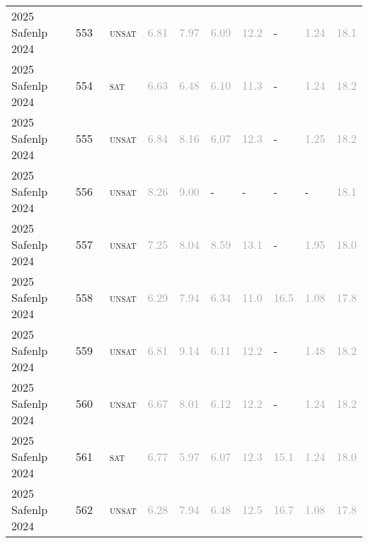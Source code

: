 \begin{center}
{\begin{longtable}{@{}llllllllll@{}}
2025 Safenlp 2024 & 553 & ~\textsc{unsat} & \textcolor{darkgray}{6.81} & \textcolor{darkgray}{7.97} & \textcolor{darkgray}{6.09} & \textcolor{darkgray}{12.2} & - & \textcolor{darkgray}{1.24} & \textcolor{darkgray}{18.1} \\
2025 Safenlp 2024 & 554 & ~\textsc{sat} & \textcolor{darkgray}{6.63} & \textcolor{darkgray}{6.48} & \textcolor{darkgray}{6.10} & \textcolor{darkgray}{11.3} & - & \textcolor{darkgray}{1.24} & \textcolor{darkgray}{18.2} \\
2025 Safenlp 2024 & 555 & ~\textsc{unsat} & \textcolor{darkgray}{6.84} & \textcolor{darkgray}{8.16} & \textcolor{darkgray}{6.07} & \textcolor{darkgray}{12.3} & - & \textcolor{darkgray}{1.25} & \textcolor{darkgray}{18.2} \\
2025 Safenlp 2024 & 556 & ~\textsc{unsat} & \textcolor{darkgray}{8.26} & \textcolor{darkgray}{9.00} & - & - & - & - & \textcolor{darkgray}{18.1} \\
2025 Safenlp 2024 & 557 & ~\textsc{unsat} & \textcolor{darkgray}{7.25} & \textcolor{darkgray}{8.04} & \textcolor{darkgray}{8.59} & \textcolor{darkgray}{13.1} & - & \textcolor{darkgray}{1.95} & \textcolor{darkgray}{18.0} \\
2025 Safenlp 2024 & 558 & ~\textsc{unsat} & \textcolor{darkgray}{6.29} & \textcolor{darkgray}{7.94} & \textcolor{darkgray}{6.34} & \textcolor{darkgray}{11.0} & \textcolor{darkgray}{16.5} & \textcolor{darkgray}{1.08} & \textcolor{darkgray}{17.8} \\
2025 Safenlp 2024 & 559 & ~\textsc{unsat} & \textcolor{darkgray}{6.81} & \textcolor{darkgray}{9.14} & \textcolor{darkgray}{6.11} & \textcolor{darkgray}{12.2} & - & \textcolor{darkgray}{1.48} & \textcolor{darkgray}{18.2} \\
2025 Safenlp 2024 & 560 & ~\textsc{unsat} & \textcolor{darkgray}{6.67} & \textcolor{darkgray}{8.01} & \textcolor{darkgray}{6.12} & \textcolor{darkgray}{12.2} & - & \textcolor{darkgray}{1.24} & \textcolor{darkgray}{18.2} \\
2025 Safenlp 2024 & 561 & ~\textsc{sat} & \textcolor{darkgray}{6.77} & \textcolor{darkgray}{5.97} & \textcolor{darkgray}{6.07} & \textcolor{darkgray}{12.3} & \textcolor{darkgray}{15.1} & \textcolor{darkgray}{1.24} & \textcolor{darkgray}{18.0} \\
2025 Safenlp 2024 & 562 & ~\textsc{unsat} & \textcolor{darkgray}{6.28} & \textcolor{darkgray}{7.94} & \textcolor{darkgray}{6.48} & \textcolor{darkgray}{12.5} & \textcolor{darkgray}{16.7} & \textcolor{darkgray}{1.08} & \textcolor{darkgray}{17.8} \\

\end{longtable}}
\end{center}
